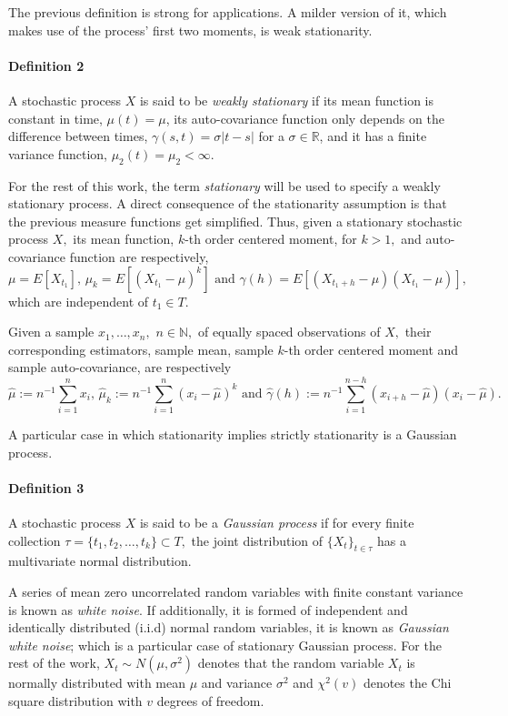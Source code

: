 The previous definition is strong for applications. A milder version of it, which makes use of the process' first two moments, is weak stationarity.

\paragraph{Definition 2}\label{definition-2}

A stochastic process \(X\) is said to be \emph{weakly stationary} if its mean function is constant in time, \(\mu(t) = \mu\), its auto-covariance function only depends on the difference between times, \(\gamma(s,t) = \sigma|t-s|\) for a \(\sigma\in \mathbb{R}\), and it has a finite variance function, \(\mu_2(t) = \mu_2 < \infty\).

For the rest of this work, the term \emph{stationary} will be used to specify a weakly stationary process. A direct consequence of the stationarity assumption is that the previous measure functions get simplified. Thus, given a stationary stochastic process \(X,\) its mean function, \(k\)-th order centered moment, for \(k>1,\) and auto-covariance function are respectively,
\[
 \mu = E[X_{t_1}]\mbox{, } \mu_k = E[(X_{t_1} -\mu)^k] \mbox{ and } \gamma(h) = E[(X_{t_1+h}-\mu)(X_{t_1}-\mu)],
\]
which are independent of \(t_1\in T.\)

Given a sample \(x_1, \ldots, x_n,\) \(n\in\mathbb{N},\) of equally spaced observations of \(X,\) their corresponding estimators, sample mean, sample \(k\)-th order centered moment and sample auto-covariance, are respectively
\[
 \widehat{\mu} := n^{-1}\sum_{i=1}^nx_i\mbox{, } \widehat{\mu}_k := n^{-1}\sum_{i=1}^n(x_i - \widehat{\mu})^k \mbox{ and }\widehat{\gamma}(h) := n^{-1}\sum_{i = 1}^{n-h}(x_{i+h} - \widehat{\mu})(x_i - \widehat{\mu}).
\]

A particular case in which stationarity implies strictly stationarity is a Gaussian process.

\paragraph{Definition 3}\label{definition-3}

A stochastic process \(X\) is said to be a \emph{Gaussian process} if for every finite collection \(\tau = \{t_1,t_2,\ldots, t_k\} \subset T,\) the joint distribution of \(\{X_t\}_{t \in \tau}\) has a multivariate normal distribution.

A series of mean zero uncorrelated random variables with finite constant variance is known as \emph{white noise}. If additionally, it is formed of independent and identically distributed (i.i.d) normal random variables, it is known as \emph{Gaussian white noise}; which is a particular case of stationary Gaussian process. For the rest of the work, \(X_t \sim N(\mu,\sigma^2)\) denotes that the random variable \(X_t\) is normally distributed with mean \(\mu\) and variance \(\sigma^2\) and \(\chi^2(v)\) denotes the Chi square distribution with \(v\) degrees of freedom.

